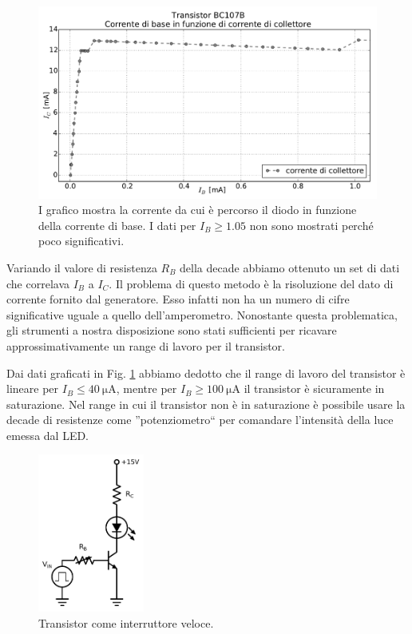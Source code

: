\begin{figure}
	\includegraphics[width=125mm]{saturazione_2.pdf}
	\caption{I grafico mostra la corrente da cui è percorso il diodo in funzione della corrente di base. I dati per $I_B \geq 1.05$ non sono mostrati perché poco significativi.}
	\label{fig:saturazione}
\end{figure}

Variando il valore di resistenza $R_B$ della decade abbiamo ottenuto un set di dati che correlava $I_B$ a $I_C$.
Il problema di questo metodo è la risoluzione del dato di corrente fornito dal generatore.
Esso infatti non ha un numero di cifre significative uguale a quello dell'amperometro.
Nonostante questa problematica, gli strumenti a nostra disposizione sono stati sufficienti per ricavare approssimativamente un range di lavoro per il transistor.



Dai dati graficati in Fig. \ref{fig:saturazione} abbiamo dedotto che il range di lavoro del transistor è lineare per $I_B \leq \SI{40}{\micro\ampere}$, mentre per $I_B \geq \SI{100}{\micro\ampere}$ il transistor è sicuramente in saturazione. Nel range in cui il transistor non è in saturazione è possibile usare la decade di resistenze come ''potenziometro`` per comandare l'intensità della luce emessa dal LED.
\newpage
\begin{figure}
	\includegraphics[width=35mm]{cc2.pdf}
	\caption{Transistor come interruttore veloce.}
	\label{fig:cc2}
\end{figure}
